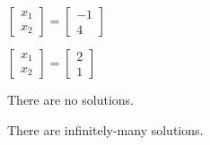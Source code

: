 \documentclass{article}
\begin{document}
\begin{readinessAssuranceTest}
\begin{multicols}{4}
\begin{readinessAssuranceTestChoices}
\item
\(
  \begin{bmatrix}
    x_1 \\
    x_2
  \end{bmatrix}=
  \begin{bmatrix}
    -1 \\
    4
  \end{bmatrix}
\)
\item
\(
  \begin{bmatrix}
    x_1 \\
    x_2
  \end{bmatrix}=
  \begin{bmatrix}
    2 \\
    1
  \end{bmatrix}
\)
\item There are no solutions.
\item There are infinitely-many solutions.
\end{readinessAssuranceTestChoices}
\end{multicols}

\end{readinessAssuranceTest}
\end{document}
